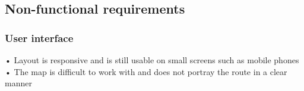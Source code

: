 \documentclass[english]{article}
\begin{document}
\subsection{Non-functional requirements}
\subsubsection{User interface}
•	Layout is responsive and is still usable on small screens such as mobile phones\\
•	The map is difficult to work with and does not portray the route in a clear manner\\
\end{document}

